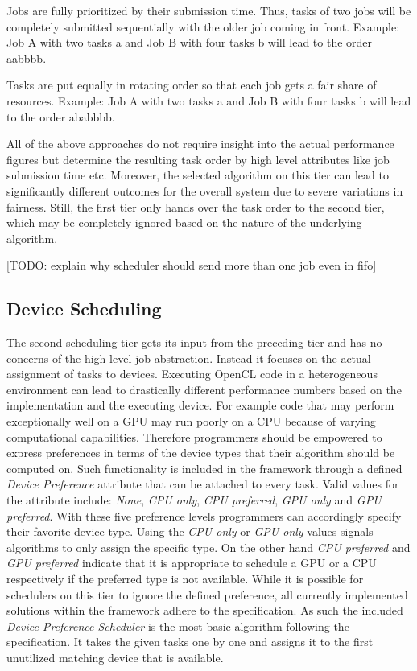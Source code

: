 \begin{description}[style=nextline]
	\item[First-In First-Out (abbrv. FIFO)] 
	Jobs are fully prioritized by their submission time. Thus, tasks of two jobs will be completely submitted sequentially with the older job coming in front. Example: Job A with two tasks a and Job B with four tasks b will lead to the order aabbbb.
	\item[Round-Robin] 
	Tasks are put equally in rotating order so that each job gets a fair share of resources. Example: Job A with two tasks a and Job B with four tasks b will lead to the order ababbbb.
\end{description}

All of the above approaches do not require insight into the actual performance figures but determine the resulting task order by high level attributes like job submission time etc. Moreover, the selected algorithm on this tier can lead to significantly different outcomes for the overall system due to severe variations in fairness. Still, the first tier only hands over the task order to the second tier, which may be completely ignored based on the nature of the underlying algorithm.

[TODO: explain why scheduler should send more than one job even in fifo]

\subsection{Device Scheduling}
The second scheduling tier gets its input from the preceding tier and has no concerns of the high level job abstraction. Instead it focuses on the actual assignment of tasks to devices. Executing OpenCL code in a heterogeneous environment can lead to drastically different performance numbers based on the implementation and the executing device. For example code that may perform exceptionally well on a GPU may run poorly on a CPU because of varying computational capabilities. Therefore programmers should be empowered to express preferences in terms of the device types that their algorithm should be computed on. Such functionality is included in the framework through a defined \textit{Device Preference} attribute that can be attached to every task. Valid values for the attribute include: \textit{None}, \textit{CPU only}, \textit{CPU preferred}, \textit{GPU only} and \textit{GPU preferred}. With these five preference levels programmers can accordingly specify their favorite device type. Using the \textit{CPU only} or \textit{GPU only} values signals algorithms to only assign the specific type. On the other hand \textit{CPU preferred} and \textit{GPU preferred} indicate that it is appropriate to schedule a GPU or a CPU respectively if the preferred type is not available. While it is possible for schedulers on this tier to ignore the defined preference, all currently implemented solutions within the framework adhere to the specification. As such the included \textit{Device Preference Scheduler} is the most basic algorithm following the specification. It takes the given tasks one by one and assigns it to the first unutilized matching device that is available.

